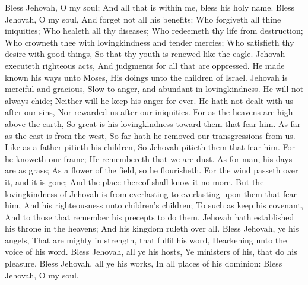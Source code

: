 Bless Jehovah, O my soul; And all that is within me, bless his holy name.  Bless Jehovah, O my soul, And forget not all his benefits:  Who forgiveth all thine iniquities; Who healeth all thy diseases;  Who redeemeth thy life from destruction; Who crowneth thee with lovingkindness and tender mercies;  Who satisfieth thy desire with good things, So that thy youth is renewed like the eagle.  Jehovah executeth righteous acts, And judgments for all that are oppressed.  He made known his ways unto Moses, His doings unto the children of Israel.  Jehovah is merciful and gracious, Slow to anger, and abundant in lovingkindness.  He will not always chide; Neither will he keep his anger for ever.  He hath not dealt with us after our sins, Nor rewarded us after our iniquities.  For as the heavens are high above the earth, So great is his lovingkindness toward them that fear him.  As far as the east is from the west, So far hath he removed our transgressions from us.  Like as a father pitieth his children, So Jehovah pitieth them that fear him.  For he knoweth our frame; He remembereth that we are dust.  As for man, his days are as grass; As a flower of the field, so he flourisheth.  For the wind passeth over it, and it is gone; And the place thereof shall know it no more.  But the lovingkindness of Jehovah is from everlasting to everlasting upon them that fear him, And his righteousness unto children’s children;  To such as keep his covenant, And to those that remember his precepts to do them.  Jehovah hath established his throne in the heavens; And his kingdom ruleth over all.  Bless Jehovah, ye his angels, That are mighty in strength, that fulfil his word, Hearkening unto the voice of his word.  Bless Jehovah, all ye his hosts, Ye ministers of his, that do his pleasure.  Bless Jehovah, all ye his works, In all places of his dominion: Bless Jehovah, O my soul. 

